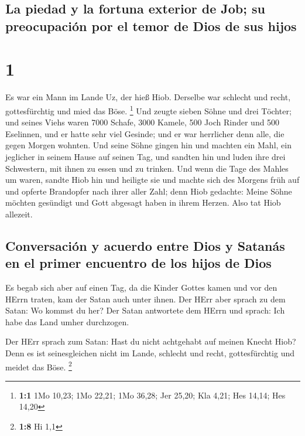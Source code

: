\hypertarget{la-piedad-y-la-fortuna-exterior-de-job-su-preocupaciuxf3n-por-el-temor-de-dios-de-sus-hijos}{%
\subsection{La piedad y la fortuna exterior de Job; su preocupación por
el temor de Dios de sus
hijos}\label{la-piedad-y-la-fortuna-exterior-de-job-su-preocupaciuxf3n-por-el-temor-de-dios-de-sus-hijos}}

\hypertarget{section}{%
\section{1}\label{section}}

 Es war ein Mann im Lande Uz, der hieß Hiob. Derselbe war
schlecht und recht, gottesfürchtig und mied das Böse. \footnote{\textbf{1:1}
  1Mo 10,23; 1Mo 22,21; 1Mo 36,28; Jer 25,20; Kla 4,21; Hes 14,14; Hes
  14,20}  Und zeugte sieben Söhne und drei Töchter;
 und seines Viehs waren 7000 Schafe, 3000 Kamele, 500 Joch
Rinder und 500 Eselinnen, und er hatte sehr viel Gesinde; und er war
herrlicher denn alle, die gegen Morgen wohnten.  Und seine
Söhne gingen hin und machten ein Mahl, ein jeglicher in seinem Hause auf
seinen Tag, und sandten hin und luden ihre drei Schwestern, mit ihnen zu
essen und zu trinken.  Und wenn die Tage des Mahles um
waren, sandte Hiob hin und heiligte sie und machte sich des Morgens früh
auf und opferte Brandopfer nach ihrer aller Zahl; denn Hiob gedachte:
Meine Söhne möchten gesündigt und Gott abgesagt haben in ihrem Herzen.
Also tat Hiob allezeit.

\hypertarget{conversaciuxf3n-y-acuerdo-entre-dios-y-satanuxe1s-en-el-primer-encuentro-de-los-hijos-de-dios}{%
\subsection{Conversación y acuerdo entre Dios y Satanás en el primer
encuentro de los hijos de
Dios}\label{conversaciuxf3n-y-acuerdo-entre-dios-y-satanuxe1s-en-el-primer-encuentro-de-los-hijos-de-dios}}

 Es begab sich aber auf einen Tag, da die Kinder Gottes
kamen und vor den HErrn traten, kam der Satan auch unter ihnen.
 Der HErr aber sprach zu dem Satan: Wo kommst du her? Der
Satan antwortete dem HErrn und sprach: Ich habe das Land umher
durchzogen.

 Der HErr sprach zum Satan: Hast du nicht achtgehabt auf
meinen Knecht Hiob? Denn es ist seinesgleichen nicht im Lande, schlecht
und recht, gottesfürchtig und meidet das Böse. \footnote{\textbf{1:8} Hi
  1,1}

